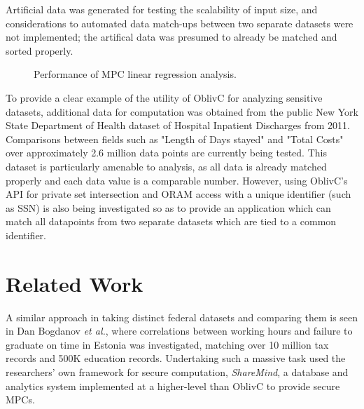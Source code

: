 \documentclass[conference]{IEEEtran}
\begin{document}
Artificial data was generated for testing the scalability of input size, and
considerations to automated data match-ups between two separate datasets were not
implemented; the artifical data was presumed to already be matched and sorted properly.
\begin{figure}[!t]
\centering
{}
\caption{Performance of MPC linear regression analysis.}
\label{xy_plot}
\end{figure}
To provide a clear example of the utility of OblivC for analyzing sensitive datasets, additional data for computation was obtained from the public 
New York State Department of Health dataset of Hospital Inpatient Discharges from 2011\cite{healthdata:ny}. 
Comparisons between fields such as "Length of Days stayed" and "Total Costs" over approximately 2.6 million data points are currently being tested.
This dataset is particularly amenable to analysis, as all data is already matched properly and each data value is a comparable number.
However, using OblivC's API for private set intersection and ORAM access with a unique identifier (such as SSN) is also being investigated so as to provide an application which can match all datapoints from two separate datasets which are tied to a common identifier.

\section{Related Work}
A similar approach in taking distinct federal datasets and comparing them is seen in
Dan Bogdanov \emph{et al.}, where correlations between working hours and failure to
graduate on time in Estonia was investigated, matching over 10 million 
tax records and 500K education records\cite{cryptoeprint:2015:1159}.
Undertaking such a massive task used the researchers' own framework for secure
computation, \emph{ShareMind}, a database and analytics system implemented at a higher-level than OblivC to provide secure MPCs. 
\end{document}
